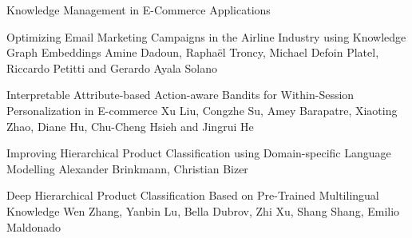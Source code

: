 \documentclass[11pt]{article}
\begin{document}
\begin{bulletin}
\begin{articlesection}{Knowledge Management in E-Commerce Applications}
\begin{article}
{Optimizing Email Marketing Campaigns in the Airline Industry using Knowledge Graph Embeddings}
{Amine Dadoun, Raphaël Troncy, Michael Defoin Platel, Riccardo Petitti and Gerardo Ayala Solano}

\end{article}

\begin{article}
{Interpretable Attribute-based Action-aware Bandits for Within-Session Personalization in E-commerce}
{Xu Liu, Congzhe Su, Amey Barapatre, Xiaoting Zhao, Diane Hu, Chu-Cheng Hsieh and Jingrui He}

\end{article}

\begin{article}
{Improving Hierarchical Product Classification using Domain-specific Language Modelling}
{Alexander Brinkmann, Christian Bizer}

\end{article}

\begin{article}
{Deep Hierarchical Product Classification Based on Pre-Trained Multilingual Knowledge}
{Wen Zhang, Yanbin Lu, Bella Dubrov, Zhi Xu, Shang Shang, Emilio Maldonado}

\end{article}


\end{articlesection}

\begin{callsection}


\end{callsection}
\end{bulletin}
\end{document}
